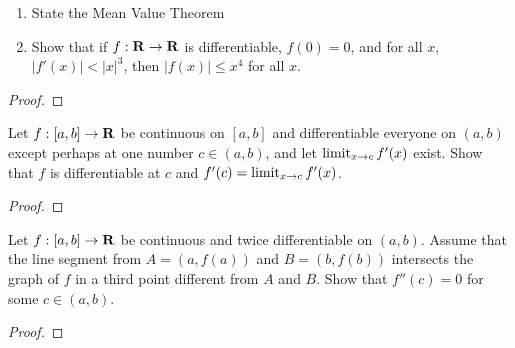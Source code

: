 \documentclass[11pt,twoside,openany]{memoir}
\begin{document}
\newpage
\fancyhead[L]{\scalebox{0.9}{Derivatives and the Mean Value Theorem}}
\fancyhead[R]{\scalebox{0.9}{Appeared on: F24}}
\begin{problem}
    \phantom{a}
    \begin{enumerate}[label = (\arabic*)]
        \item State the Mean Value Theorem
        \item Show that if $f:\mathbf{R} \rightarrow \mathbf{R}$ is differentiable, $f(0) = 0$, and for all $x$, $|f'(x)| < |x|^3$, then $|f(x)| \leq x^4$ for all $x$.
    \end{enumerate}
\end{problem}
\begin{proof}
\end{proof}

\newpage
\fancyhead[L]{\scalebox{0.9}{Derivatives and the Mean Value Theorem}}
\fancyhead[R]{\scalebox{0.9}{Appeared on: W24}}
\begin{problem}
    Let $f:[a,b] \rightarrow \mathbf{R}$ be continuous on $[a,b]$ and differentiable everyone on $(a,b)$ except perhaps at one number $c \in (a,b)$, and let $\operatorname*{limit}_{x \rightarrow c}f'(x)$ exist. Show that $f$ is differentiable at $c$ and $f'(c) = \operatorname*{limit}_{x \rightarrow c}f'(x)$.
\end{problem}
\begin{proof}
\end{proof}

\newpage
\fancyhead[L]{\scalebox{0.9}{Derivatives and the Mean Value Theorem}}
\fancyhead[R]{\scalebox{0.9}{Appeared on: F23}}
\begin{problem}
    Let $f:[a,b] \rightarrow \mathbf{R}$ be continuous and twice differentiable on $(a,b)$. Assume that the line segment from $A = (a,f(a))$ and $B = (b,f(b))$ intersects the graph of $f$ in a third point different from $A$ and $B$. Show that $f''(c) = 0$ for some $c \in (a,b)$.
\end{problem}
\begin{proof}
\end{proof}
\end{document}
